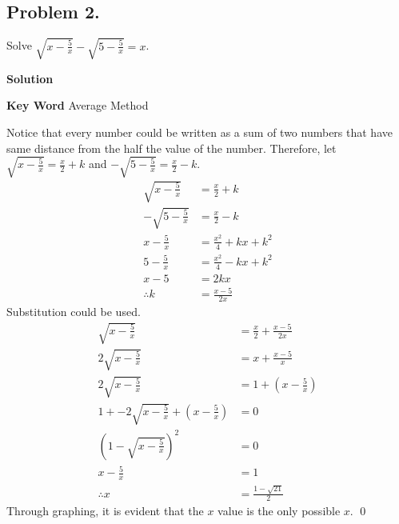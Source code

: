 \documentclass{article}
\newenvironment{solution}{\begin{trivlist}\item[]{\bf Solution}}{\qed \end{trivlist}}
\begin{document}
\subsection*{Problem 2.}
Solve $\sqrt{x - \frac{5}{x}} - \sqrt{5 - \frac{5}{x}} = x$.
\begin{solution}

\textbf{Key Word} Average Method

Notice that every number could be written as a sum of
two numbers that have same distance from the half the
value of the number. Therefore, let $\sqrt{x - \frac{5}{x}}
= \frac{x}{2} + k$ and $-\sqrt{5 - \frac{5}{x}} = \frac{x}{2} - k$.
\begin{align*}
    \sqrt{x - \frac{5}{x}} &= \frac{x}{2} + k \\
    -\sqrt{5 - \frac{5}{x}} &= \frac{x}{2} - k \\
    x - \frac{5}{x} &= \frac{x^2}{4} + kx + k^2 \\
    5 - \frac{5}{x} &= \frac{x^2}{4} - kx + k^2 \\
    x - 5 &= 2kx \\
    \therefore k &= \frac{x - 5}{2x}
\end{align*}
Substitution could be used.
\begin{align*}
    \sqrt{x - \frac{5}{x}} &= \frac{x}{2} + \frac{x - 5}{2x} \\
    2\sqrt{x - \frac{5}{x}} &= x + \frac{x - 5}{x} \\
    2\sqrt{x - \frac{5}{x}} &= 1 + \left( x - \frac{5}{x} \right) \\
    1 + - 2\sqrt{x - \frac{5}{x}}
        + \left( x - \frac{5}{x} \right) &= 0 \\
    (1 - \sqrt{x - \frac{5}{x}})^2 &= 0 \\
    x - \frac{5}{x} &= 1 \\
    \therefore x &= \boxed{\frac{1 - \sqrt{21}}{2}}
\end{align*}
Through graphing, it is evident that the $x$ value is
the only possible $x$.
\end{solution}
\end{document}
